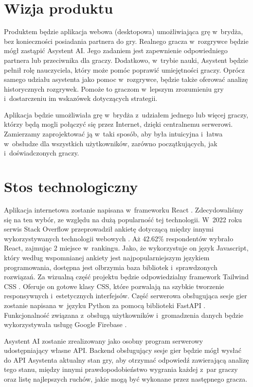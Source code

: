 \section{Wizja produktu}

Produktem będzie aplikacja webowa (desktopowa) umożliwiająca grę w~brydża,
bez konieczności posiadania partnera do gry. Realnego gracza w~rozgrywce
będzie mógł zastąpić Asystent AI. Jego zadaniem jest zapewnienie odpowiedniego
partnera lub przeciwnika dla graczy. Dodatkowo, w~trybie nauki, Asystent będzie pełnił rolę nauczyciela,
który może pomóc poprawić umiejętności graczy. Oprócz samego udziału
asystenta jako pomoc w~rozgrywce, będzie także oferować analizę historycznych
rozgrywek. Pomoże to graczom w~lepszym zrozumieniu gry i~dostarczeniu im
wskazówek dotyczących strategii.

Aplikacja będzie umożliwiała grę w~brydża z~udziałem jednego lub więcej graczy,
którzy będą mogli połączyć się przez Internet, dzięki centralnemu serwerowi.
Zamierzamy zaprojektować ją w~taki sposób, aby była intuicyjna i~łatwa
w~obsłudze dla wszystkich użytkowników, zarówno początkujących, jak
i~doświadczonych graczy.


\section{Stos technologiczny}

Aplikacja internetowa zostanie napisana w~frameworku React \cite{React}.
Zdecydowaliśmy się na ten wybór, ze względu na dużą popularność tej
technologii. W~2022 roku serwis Stack Overflow \cite{StackOverflow} przeprowadził ankietę dotyczącą między innymi wykorzystywanych technologii
webowych \cite{React-stack}. Aż 42.62\% respondentów wybrało React,
zajmując 2 miejsce w~rankingu. Jako, że wykorzystuje on język Javascript,
który według wspomnianej ankiety jest najpopularniejszym językiem programowania,
dostępna jest olbrzymia baza bibliotek i~sprawdzonych rozwiązań. Za wizualną
część projektu będzie odpowiedzialny framework Tailwind CSS \cite{Tailwind}.
Oferuje on gotowe klasy CSS, które pozwalają na szybkie tworzenie responsywnych
i~estetycznych interfejsów. Część serwerowa obsługująca sesje gier zostanie
napisana w~języku Python \cite{Python} za pomocą biblioteki FastAPI
\cite{FastAPI}. Funkcjonalność związana z~obsługą użytkowników i~gromadzenia
danych będzie wykorzystywała usługę Google Firebase \cite{Firebase}.

Asystent AI zostanie zrealizowany jako osobny program serwerowy
udostępniający własne API. Backend obsługujący sesje gier
będzie mógł wysłać do API Asystenta aktualny stan gry, aby otrzymać
odpowiedź zawierającą analizę tego stanu, między innymi
prawdopodobieństwo wygrania każdej z~par graczy oraz listę
najlepszych ruchów, jakie mogą być wykonane przez następnego gracza.

